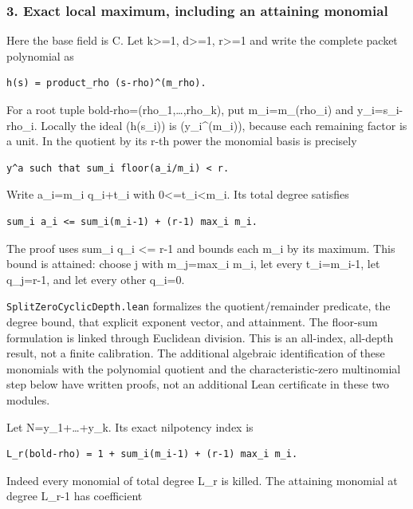 \subsubsection{3. Exact local maximum, including an attaining
monomial}\label{conormal_cyclic_pr21:exact-local-maximum-including-an-attaining-monomial}

Here the base field is C. Let k\textgreater=1, d\textgreater=1, r\textgreater=1 and write the
complete packet polynomial as

\begin{verbatim}
h(s) = product_rho (s-rho)^(m_rho).
\end{verbatim}

For a root tuple bold-rho=(rho\_1,\ldots,rho\_k), put m\_i=m\_(rho\_i) and y\_i=s\_i-rho\_i. Locally
the ideal (h(s\_i)) is (y\_i\^{}(m\_i)), because each remaining factor is a unit. In the quotient by
its r-th power the monomial basis is precisely

\begin{verbatim}
y^a such that sum_i floor(a_i/m_i) < r.
\end{verbatim}

Write a\_i=m\_i q\_i+t\_i with 0\textless=t\_i\textless m\_i. Its total degree satisfies

\begin{verbatim}
sum_i a_i <= sum_i(m_i-1) + (r-1) max_i m_i.
\end{verbatim}

The proof uses sum\_i q\_i \textless= r-1 and bounds each m\_i by its maximum. This bound is
attained: choose j with m\_j=max\_i m\_i, let every t\_i=m\_i-1, let q\_j=r-1, and let every other
q\_i=0.

\nolinkurl{SplitZeroCyclicDepth.lean} formalizes the quotient/remainder predicate, the degree bound,
that explicit exponent vector, and attainment. The floor-sum formulation is linked through Euclidean
division. This is an all-index, all-depth result, not a finite calibration. The additional algebraic
identification of these monomials with the polynomial quotient and the characteristic-zero
multinomial step below have written proofs, not an additional Lean certificate in these two modules.

Let N=y\_1+\ldots+y\_k. Its exact nilpotency index is

\begin{verbatim}
L_r(bold-rho) = 1 + sum_i(m_i-1) + (r-1) max_i m_i.
\end{verbatim}

Indeed every monomial of total degree L\_r is killed. The attaining monomial at degree L\_r-1 has
coefficient

